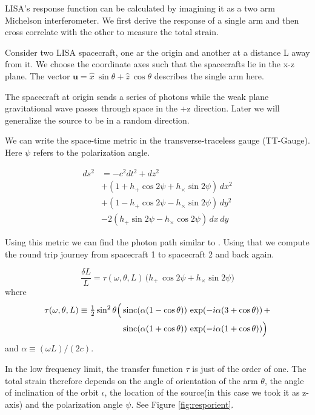 \documentclass[10pt,a4paper]{article}
\def\sinc{\mathop{\rm sinc}\nolimits}
\begin{document}
LISA's response function can be calculated by imagining it as a two arm Michelson interferometer. We first derive the response of a single arm and then cross correlate with the other to measure the total strain.

Consider two LISA spacecraft, one ar the origin and another at a distance L away from it.  We choose the coordinate axes such that the spacecrafts lie in the x-z plane. The vector  $ \textbf{u} = \hat{x} \ \sin \theta + \hat{z} \ \cos \theta$ describes the single arm here.

The spacecraft at origin sends a series of photons while the weak plane gravitational wave passes through space in the +z direction. Later we will generalize the source to be in a random direction.

We can write the space-time metric in the transverse-traceless gauge
(TT-Gauge). Here $\psi$ refers to the polarization angle.

\begin{equation}
\begin{aligned}
ds^2 &= -c^2 dt^2 + dz^2 \\
&+ (1 + h_+\cos2\psi + h_\times\sin2\psi) \, dx^2 \\
&+ (1 - h_+\cos2\psi - h_\times\sin2\psi) \, dy^2 \\
&- 2(h_+\sin2\psi - h_\times\cos2\psi) \, dx\,dy
\end{aligned}
\end{equation}

Using this metric we can  find the photon path similar to
\cite{cornish}.
Using that we compute the round trip journey from spacecraft 1 to spacecraft 2 and back again.

\begin{equation}
  \frac{\delta L}L = \tau(\omega,\theta,L) \,
  \Big( h_+ \, \cos2\psi + h_\times \sin2\psi \Big)
\end{equation}
where
\begin{equation}
\begin{aligned}
  \tau(\omega,\theta,L) \equiv {\textstyle\frac12} \sin^2\theta
  \Big( &\sinc(\alpha(1-\cos\theta))\,\exp(-i\alpha(3+\cos\theta)) \, + \\
        &\sinc(\alpha(1+\cos\theta))\,\exp(-i\alpha(1+\cos\theta)) \Big)
\end{aligned}  
\end{equation}
and $\alpha\equiv(\omega L)/(2c)$.

In the low frequency limit, the transfer function $\tau$ is just of the order of one.
The total strain therefore depends on the angle of orientation of the
arm $\theta$, the angle of inclination of the orbit $\iota$, the
location of the source(in this case we took it as z-axis) and the
polarization angle $\psi$.  See Figure \ref{fig:resporient}.
\end{document}
